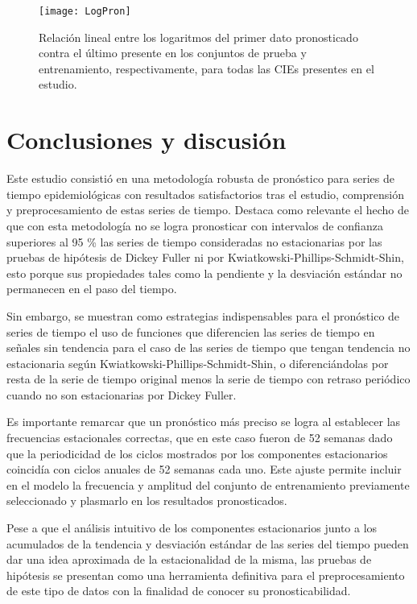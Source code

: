\documentclass[final,5p,times,twocolumn]{elsarticle}
\begin{document}
\begin{figure}
  \texttt{[image: LogPron]}
  \caption{Relación lineal entre los logaritmos del primer dato pronosticado contra el último presente en los conjuntos de prueba y entrenamiento, respectivamente, para todas las CIEs presentes en el estudio.}
  \label{LogPron}
\end{figure}

\section{Conclusiones y discusión}
\label{sec:conclusion}

Este estudio consistió en una metodología robusta de pronóstico para series de tiempo epidemiológicas con resultados satisfactorios tras el estudio, comprensión y preprocesamiento de estas series de tiempo. Destaca como relevante el hecho de que con esta metodología no se logra pronosticar con intervalos de confianza superiores al 95 \% las series de tiempo consideradas no estacionarias por las pruebas de hipótesis de Dickey Fuller ni por Kwiatkowski-Phillips-Schmidt-Shin, esto porque sus propiedades tales como la pendiente y la desviación estándar no permanecen en el paso del tiempo. 

Sin embargo, se muestran como estrategias indispensables para el pronóstico de series de tiempo el uso de funciones que diferencien las series de tiempo en señales sin tendencia para el caso de las series de tiempo que tengan tendencia no estacionaria según Kwiatkowski-Phillips-Schmidt-Shin, o diferenciándolas por resta de la serie de tiempo original menos la serie de tiempo con retraso periódico cuando no son estacionarias por Dickey Fuller.

Es importante remarcar que un pronóstico más preciso se logra al establecer las frecuencias estacionales correctas, que en este caso fueron de 52 semanas dado que la periodicidad de los ciclos mostrados por los componentes estacionarios coincidía con ciclos anuales de 52 semanas cada uno. Este ajuste permite incluir en el modelo la frecuencia y amplitud del conjunto de entrenamiento previamente seleccionado y plasmarlo en los resultados pronosticados.

Pese a que el análisis intuitivo de los componentes estacionarios junto a los acumulados de la tendencia y desviación estándar de las series del tiempo pueden dar una idea aproximada de la estacionalidad de la misma, las pruebas de hipótesis se presentan como una herramienta definitiva para el preprocesamiento de este tipo de datos con la finalidad de conocer su pronosticabilidad. 
\end{document}
